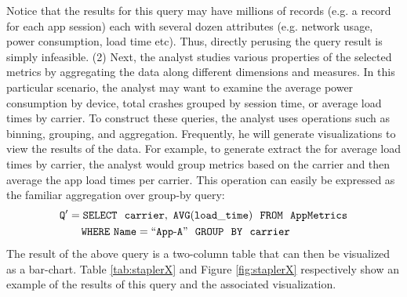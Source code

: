 \noindent Notice that the results for this query may have millions of records
(e.g. a record for each app session) each with several dozen attributes (e.g.
network usage, power consumption, load time etc).
Thus, directly perusing the query result is simply infeasible.
(2) Next, the analyst studies various properties of the selected metrics by
aggregating the data along different dimensions and measures. 
In this particular scenario, the analyst may want to examine the average power
consumption by device, total crashes grouped by session time, or average load
times by carrier.
To construct these queries, the analyst uses operations such as binning,
grouping, and aggregation.  Frequently, he will generate visualizations to view
the results of the data.
For example, to generate extract the for average load times by carrier, the
analyst would group metrics based on the carrier and then average the app load
times per carrier.
This operation can easily be expressed as the familiar aggregation over group-by
query:
\noindent
\begin{align*}
& \tt Q' = SELECT \ \ carrier,\ AVG(load\_time) \ \ FROM \ \  AppMetrics \\
& \tt \hspace{20pt} WHERE\ Name=``App\text{-}A" \ \ GROUP  \ \ BY \ \ carrier
\end{align*}
The result of the above query is a two-column table that can then be visualized
as a bar-chart. Table \ref{tab:staplerX} and Figure
\ref{fig:staplerX} respectively show an example of the results of this query and
the associated visualization.


